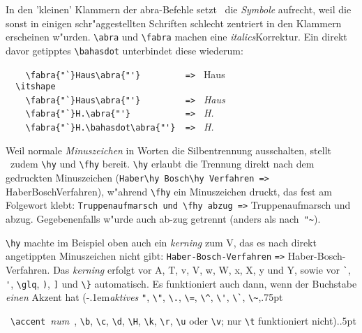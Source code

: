 \documentclass[12pt,a4paper]{article}
\newcommand{\pdfko}[1]{\kern #1pt
                          \strut\ignorespaces}%
\begin{document}
\vspace{1ex}\vfill\noindent
In den 'kleinen' Klammern der abra-Befehle setzt \BibArts\ 
die \textit{Symbole} aufrecht,
weil die sonst in einigen schr"aggestellten Schriften 
schlecht zentriert in den Klammern erscheinen w"urden. 
\verb|\abra| und \verb|\fabra| machen eine 
\textit{italics}\hy Korrektur. Ein direkt davor getipptes 
\verb|\bahasdot| unterbindet diese wiederum:

\vspace{1.75ex}\noindent
\verb|    Haus         => | {\fabra{"`}Haus\abra{"'}} \\
\verb|  \itshape | \\
\verb|    Haus         => | {\itshape {}Haus} \\
\verb|    \fabra{"`}H.\abra{"'}           => | {\itshape {}H.\abra{"'}} \\
\verb|    \fabra{"`}H.\bahasdot{}  => | {\itshape \fabra{"`}H.\bahasdot\abra{"'}}

\vspace{2ex}\noindent
Weil normale \textit{Minuszeichen} in Worten die Silbentrennung ausschalten,
stellt \BibArts\ zudem \verb|\hy| und \verb|\fhy| bereit. 
\verb|\hy| erlaubt die Trennung direkt nach dem gedruckten Minuszeichen 
(\verb|Haber\hy Bosch\hy Verfahren =>| Haber\hy Bosch\hy Verfahren),
w"ahrend \verb|\fhy| ein Minuszeichen druckt, das fest am
Folgewort klebt: \verb|Truppenaufmarsch und \fhy abzug =>| 
Truppenaufmarsch und \fhy abzug. Gegebenenfalls w"urde auch ab-zug getrennt
(anders als nach~\verb|"~|).

\vspace{1ex}\noindent
\verb|\hy| machte im Beispiel oben auch ein \textit{kerning} zum V\ko,
das es nach direkt angetippten Minuszeichen nicht gibt:
\hspace{.3em}\verb|Haber-Bosch-Verfahren| 
\hspace{.3em}\verb|=>| \hspace{.2em}Haber-Bosch-Verfahren. 
Das \textit{kerning} erfolgt vor A, T\ko, v, V\ko, w, W\ko, x, X, y und Y\ko, sowie vor 
\verb|`|, \verb|'|, \verb|\glq|, \verb|)|, \verb|]| und \verb|\}| automatisch.
Es funktioniert auch dann, wenn der Buchstabe \textit{einen} Akzent hat
(\kern-.1em\textit{aktives} \hspace{-.1em}\verb|"|, \verb|\"|, 
\verb|\.|, \verb|\=|, \verb|\^|, \verb|\'|, \verb|\`|, 
\verb|\~|,\pdfko{.75}\ 
\verb*|\accent |\textit{num}\verb*| |,
\verb|\b|, \verb|\c|, \verb|\d|, \verb|\H|, \verb|\k|, 
\verb|\r|, \verb|\u| oder \verb|\v|; nur \verb|\t| 
funktioniert nicht).\pdfko{.5}
\end{document}
